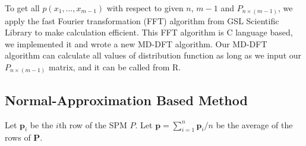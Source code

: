 \documentclass[12pt]{article}
\newcommand{\Pmat}{\mathbf{P}}
\newcommand{\pvec}{\boldsymbol{p}}
\begin{document}
To get all $p(x_1,\dots,x_{m-1})$ with respect to given $n$, $m-1$ and $P_{n \times (m-1)}$, we apply the fast Fourier transformation (FFT) algorithm  from GSL Scientific Library to make calculation efficient. This FFT algorithm is C language based, we implemented it and wrote a new MD-DFT algorithm. Our MD-DFT algorithm can calculate all values of distribution function as long as we input our $P_{n\times (m-1)}$ matrix, and it can be called from R.



\subsection{Normal-Approximation Based Method}
Let $\pvec_i$ be the $i$th row of the SPM $P$. Let $\pvec=\sum_{i=1}^n\pvec_i/n$ be the average of the rows of $\Pmat$.
\end{document}
